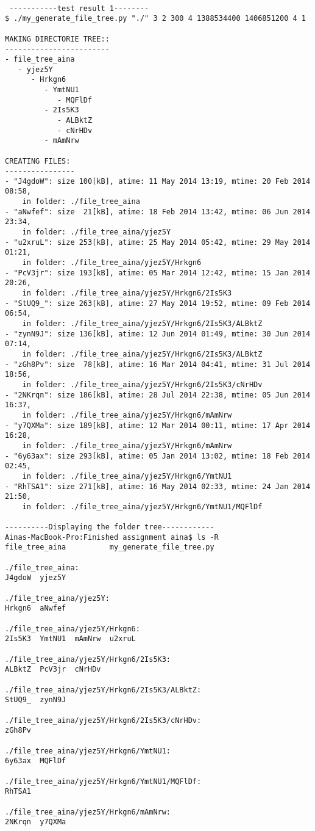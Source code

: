 \documentclass{article}
\begin{document}
\begin{verbatim}

 -----------test result 1--------
$ ./my_generate_file_tree.py "./" 3 2 300 4 1388534400 1406851200 4 1

MAKING DIRECTORIE TREE::
------------------------ 
- file_tree_aina
   - yjez5Y
      - Hrkgn6
         - YmtNU1
            - MQFlDf
         - 2Is5K3
            - ALBktZ
            - cNrHDv
         - mAmNrw

CREATING FILES:
---------------- 
- "J4gdoW": size 100[kB], atime: 11 May 2014 13:19, mtime: 20 Feb 2014 08:58, 
	in folder: ./file_tree_aina
- "aNwfef": size  21[kB], atime: 18 Feb 2014 13:42, mtime: 06 Jun 2014 23:34,
	in folder: ./file_tree_aina/yjez5Y
- "u2xruL": size 253[kB], atime: 25 May 2014 05:42, mtime: 29 May 2014 01:21, 
	in folder: ./file_tree_aina/yjez5Y/Hrkgn6
- "PcV3jr": size 193[kB], atime: 05 Mar 2014 12:42, mtime: 15 Jan 2014 20:26, 
	in folder: ./file_tree_aina/yjez5Y/Hrkgn6/2Is5K3
- "StUQ9_": size 263[kB], atime: 27 May 2014 19:52, mtime: 09 Feb 2014 06:54, 
	in folder: ./file_tree_aina/yjez5Y/Hrkgn6/2Is5K3/ALBktZ
- "zynN9J": size 136[kB], atime: 12 Jun 2014 01:49, mtime: 30 Jun 2014 07:14, 
	in folder: ./file_tree_aina/yjez5Y/Hrkgn6/2Is5K3/ALBktZ
- "zGh8Pv": size  78[kB], atime: 16 Mar 2014 04:41, mtime: 31 Jul 2014 18:56, 
	in folder: ./file_tree_aina/yjez5Y/Hrkgn6/2Is5K3/cNrHDv
- "2NKrqn": size 186[kB], atime: 28 Jul 2014 22:38, mtime: 05 Jun 2014 16:37, 
	in folder: ./file_tree_aina/yjez5Y/Hrkgn6/mAmNrw
- "y7QXMa": size 189[kB], atime: 12 Mar 2014 00:11, mtime: 17 Apr 2014 16:28, 
	in folder: ./file_tree_aina/yjez5Y/Hrkgn6/mAmNrw
- "6y63ax": size 293[kB], atime: 05 Jan 2014 13:02, mtime: 18 Feb 2014 02:45, 
	in folder: ./file_tree_aina/yjez5Y/Hrkgn6/YmtNU1
- "RhTSA1": size 271[kB], atime: 16 May 2014 02:33, mtime: 24 Jan 2014 21:50, 
	in folder: ./file_tree_aina/yjez5Y/Hrkgn6/YmtNU1/MQFlDf
	
----------Displaying the folder tree------------
Ainas-MacBook-Pro:Finished assignment aina$ ls -R
file_tree_aina			my_generate_file_tree.py

./file_tree_aina:
J4gdoW	yjez5Y

./file_tree_aina/yjez5Y:
Hrkgn6	aNwfef

./file_tree_aina/yjez5Y/Hrkgn6:
2Is5K3	YmtNU1	mAmNrw	u2xruL

./file_tree_aina/yjez5Y/Hrkgn6/2Is5K3:
ALBktZ	PcV3jr	cNrHDv

./file_tree_aina/yjez5Y/Hrkgn6/2Is5K3/ALBktZ:
StUQ9_	zynN9J

./file_tree_aina/yjez5Y/Hrkgn6/2Is5K3/cNrHDv:
zGh8Pv

./file_tree_aina/yjez5Y/Hrkgn6/YmtNU1:
6y63ax	MQFlDf

./file_tree_aina/yjez5Y/Hrkgn6/YmtNU1/MQFlDf:
RhTSA1

./file_tree_aina/yjez5Y/Hrkgn6/mAmNrw:
2NKrqn	y7QXMa
\end{verbatim}
\end{document}
